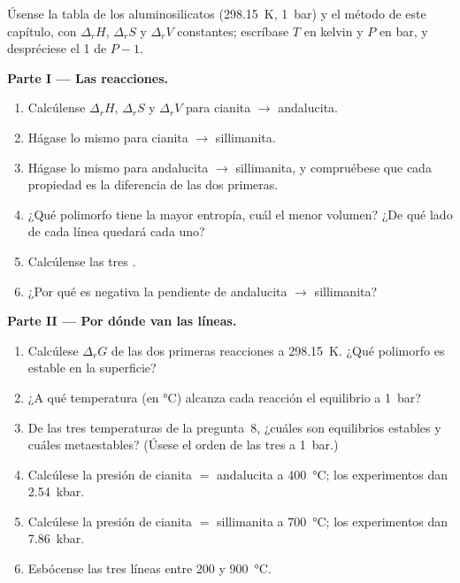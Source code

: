 \begin{problem}
\label{pb:b2:metamorphic-facies:1}
Úsense la tabla de los aluminosilicatos (\qty{298.15}{K}, \qty{1}{bar}) y el método de
este capítulo, con $\Delta_r H$, $\Delta_r S$ y $\Delta_r V$ constantes; escríbase $T$ en
kelvin y $P$ en bar, y despréciese el 1 de $P - 1$.

\noindent\textbf{Parte I --- Las reacciones.}
\begin{enumerate}
\item Calcúlense $\Delta_r H$, $\Delta_r S$ y $\Delta_r V$ para cianita $\to$ andalucita.
\item Hágase lo mismo para cianita $\to$ sillimanita.
\item Hágase lo mismo para andalucita $\to$ sillimanita, y compruébese que cada propiedad es la
diferencia de las dos primeras.
\item ¿Qué polimorfo tiene la mayor entropía, cuál el menor volumen? ¿De qué lado
de cada línea quedará cada uno?
\item Calcúlense las tres .
\item ¿Por qué es negativa la pendiente de andalucita $\to$ sillimanita?
\end{enumerate}

\noindent\textbf{Parte II --- Por dónde van las líneas.}
\begin{enumerate}[resume]
\item Calcúlese $\Delta_r G$ de las dos primeras reacciones a \qty{298.15}{K}. ¿Qué
polimorfo es estable en la superficie?
\item ¿A qué temperatura (en \unit{\celsius}) alcanza cada reacción el equilibrio a
\qty{1}{bar}?
\item De las tres temperaturas de la pregunta~8, ¿cuáles son equilibrios estables y cuáles
metaestables? (Úsese el orden de las tres a \qty{1}{bar}.)
\item Calcúlese la presión de cianita $=$ andalucita a \qty{400}{\celsius}; los
experimentos dan \qty{2.54}{kbar}.
\item Calcúlese la presión de cianita $=$ sillimanita a \qty{700}{\celsius}; los
experimentos dan \qty{7.86}{kbar}.
\item Esbócense las tres líneas entre 200 y \qty{900}{\celsius}.
\end{enumerate}


\end{problem}
